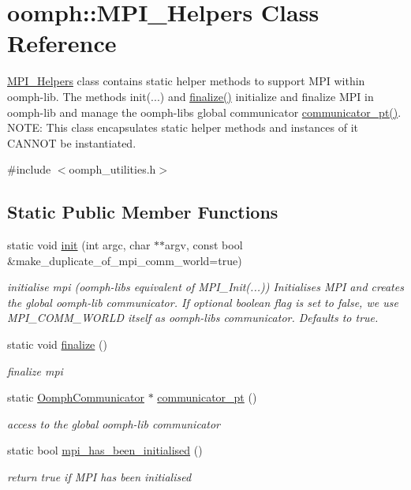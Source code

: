 \hypertarget{classoomph_1_1MPI__Helpers}{}\section{oomph\+:\+:M\+P\+I\+\_\+\+Helpers Class Reference}
\label{classoomph_1_1MPI__Helpers}


\hyperlink{classoomph_1_1MPI__Helpers}{M\+P\+I\+\_\+\+Helpers} class contains static helper methods to support M\+PI within oomph-\/lib. The methods init(...) and \hyperlink{classoomph_1_1MPI__Helpers_a471bc4697fd5edeea3fb4af1bba0e541}{finalize()} initialize and finalize M\+PI in oomph-\/lib and manage the oomph-\/libs global communicator \hyperlink{classoomph_1_1MPI__Helpers_ac16964b22bfd4f657490802beb600ffe}{communicator\+\_\+pt()}. N\+O\+TE\+: This class encapsulates static helper methods and instances of it C\+A\+N\+N\+OT be instantiated.  




{\ttfamily \#include $<$oomph\+\_\+utilities.\+h$>$}

\subsection*{Static Public Member Functions}
\begin{DoxyCompactItemize}
\item 
static void \hyperlink{classoomph_1_1MPI__Helpers_a663a35b00078ebefdc0ea0b7190212e4}{init} (int argc, char $\ast$$\ast$argv, const bool \&make\+\_\+duplicate\+\_\+of\+\_\+mpi\+\_\+comm\+\_\+world=true)
\begin{DoxyCompactList}\small\item\em initialise mpi (oomph-\/libs equivalent of M\+P\+I\+\_\+\+Init(...)) Initialises M\+PI and creates the global oomph-\/lib communicator. If optional boolean flag is set to false, we use M\+P\+I\+\_\+\+C\+O\+M\+M\+\_\+\+W\+O\+R\+LD itself as oomph-\/lib\textquotesingle{}s communicator. Defaults to true. \end{DoxyCompactList}\item 
static void \hyperlink{classoomph_1_1MPI__Helpers_a471bc4697fd5edeea3fb4af1bba0e541}{finalize} ()
\begin{DoxyCompactList}\small\item\em finalize mpi \end{DoxyCompactList}\item 
static \hyperlink{classoomph_1_1OomphCommunicator}{Oomph\+Communicator} $\ast$ \hyperlink{classoomph_1_1MPI__Helpers_ac16964b22bfd4f657490802beb600ffe}{communicator\+\_\+pt} ()
\begin{DoxyCompactList}\small\item\em access to the global oomph-\/lib communicator \end{DoxyCompactList}\item 
static bool \hyperlink{classoomph_1_1MPI__Helpers_aa376d403f6bc99e8595d227135932b0e}{mpi\+\_\+has\+\_\+been\+\_\+initialised} ()
\begin{DoxyCompactList}\small\item\em return true if M\+PI has been initialised \end{DoxyCompactList}\end{DoxyCompactItemize}
